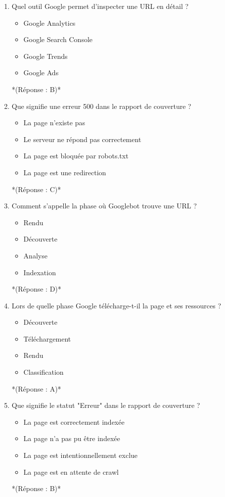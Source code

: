 \documentclass[12pt,a4paper,twoside]{report}
\begin{document}
\begin{enumerate}
\item Quel outil Google permet d'inspecter une URL en détail ?
\begin{itemize}
\item[A)] Google Analytics
\item[B)] Google Search Console
\item[C)] Google Trends
\item[D)] Google Ads
\end{itemize}
*(Réponse : B)*

\item Que signifie une erreur 500 dans le rapport de couverture ?
\begin{itemize}
\item[A)] La page n'existe pas
\item[B)] Le serveur ne répond pas correctement
\item[C)] La page est bloquée par robots.txt
\item[D)] La page est une redirection
\end{itemize}
*(Réponse : C)*

\item Comment s'appelle la phase où Googlebot trouve une URL ?
\begin{itemize}
\item[A)] Rendu
\item[B)] Découverte
\item[C)] Analyse
\item[D)] Indexation
\end{itemize}
*(Réponse : D)*

\item Lors de quelle phase Google télécharge-t-il la page et ses ressources ?
\begin{itemize}
\item[A)] Découverte
\item[B)] Téléchargement
\item[C)] Rendu
\item[D)] Classification
\end{itemize}
*(Réponse : A)*

\item Que signifie le statut "Erreur" dans le rapport de couverture ?
\begin{itemize}
\item[A)] La page est correctement indexée
\item[B)] La page n'a pas pu être indexée
\item[C)] La page est intentionnellement exclue
\item[D)] La page est en attente de crawl
\end{itemize}
*(Réponse : B)*


\end{enumerate}
\end{document}
